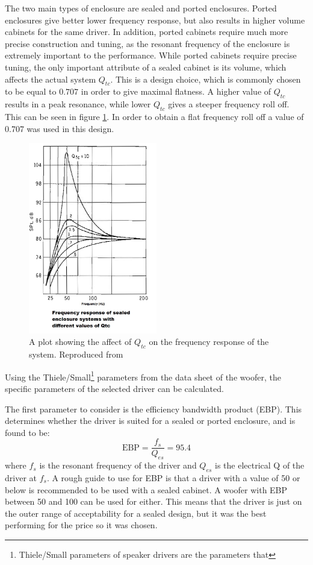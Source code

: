 \documentclass[main.tex]{subfiles}
\begin{document}
The two main types of enclosure are sealed and ported enclosures.
Ported enclosures give better lower frequency response, but also results in higher volume cabinets for the same driver.
In addition, ported cabinets require much more precise construction and tuning, as the resonant frequency of the enclosure is extremely important to the performance.
While ported cabinets require precise tuning, the only important attribute of a sealed cabinet is its volume, which affects the actual system $Q_{tc}$.
This is a design choice, which is commonly chosen to be equal to $0.707$ in order to give maximal flatness.
A higher value of $Q_{tc}$ results in a peak resonance, while lower $Q_{tc}$ gives a steeper frequency roll off.
This can be seen in figure \ref{fig:qtcplot}.
In order to obtain a flat frequency roll off a value of 0.707 was used in this design.
\begin{figure}
    \centering
    \includegraphics[width=0.5\textwidth]{figs/qtcResponsePlot.jpg}
    \caption{A plot showing the affect of $Q_{tc}$ on the frequency response of the system. Reproduced from \cite{qtcPlot}}
    \label{fig:qtcplot}
\end{figure}

Using the Thiele/Small\footnote{Thiele/Small parameters of speaker drivers are the parameters that } parameters from the data sheet of the woofer\cite{woofer}, the specific parameters of the selected driver can be calculated.

The first parameter to consider is the efficiency bandwidth product (EBP).
This determines whether the driver is suited for a sealed or ported enclosure, and is found to be:
\begin{equation}
    \mbox{EBP} = \frac{f_s}{Q_{es}} = 95.4
\end{equation}
where $f_s$ is the resonant frequency of the driver and $Q_{es}$ is the electrical Q of the driver at $f_s$.
A rough guide to use for EBP is that a driver with a value of 50 or below is recommended to be used with a sealed cabinet.
A woofer with EBP between 50 and 100 can be used for either.
This means that the driver is just on the outer range of acceptability for a sealed design, but it was the best performing for the price so it was chosen.
\end{document}
